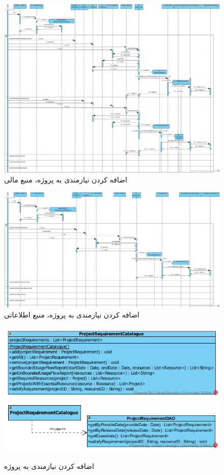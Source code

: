 \begin{landscape}
\begin{figure}[H]
	\includegraphics[scale=0.4]{img/sequence-design/AddRequirementToProject_MONETARY}
	\caption{اضافه کردن نیازمندی به پروژه، منبع مالی}
\end{figure}
\begin{figure}[H]
	\centering
	\includegraphics[scale=0.5]{img/sequence-design/AddRequirementToProject_INFORMATION}
	\caption{اضافه کردن نیازمندی به پروژه، منبع اطلاعاتی}
\end{figure}

\begin{figure}[H]
	\centering
	\includegraphics[scale=0.7]{img/sequence-design/AddRequirementToProjectC}
	\includegraphics[scale=0.7]{img/sequence-design/AddRequirementToProjectD}
	\caption{اضافه کردن نیازمندی به پروژه}
\end{figure}


\end{landscape}

